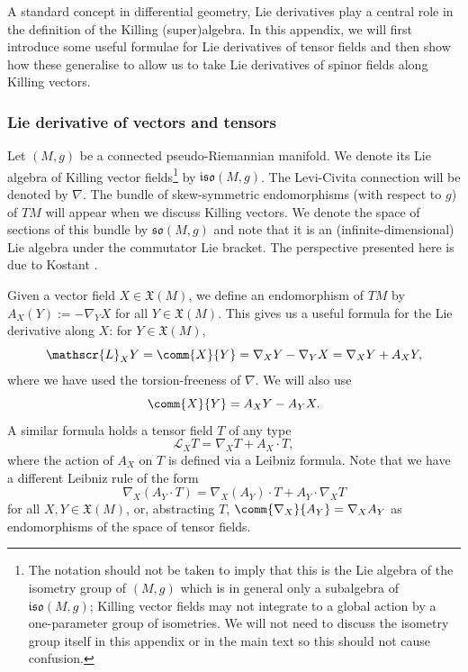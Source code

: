 \documentclass[pdftex]{sigma}
\numberwithin{equation}{section}
\newcommand{\fso}{\mathfrak{so}}
\newcommand{\fiso}{\mathfrak{iso}}
\newcommand{\fX}{\mathfrak{X}}
\newcommand{\eL}{\mathscr{L}}
\newcommand{\1}{\mathbbm{1}}
\begin{document}
A standard concept in differential geometry, Lie derivatives play a central role in the definition of the Killing (super)algebra. In this appendix, we will first introduce some useful formulae for Lie derivatives of tensor fields and then show how these generalise to allow us to take Lie derivatives of spinor fields along Killing vectors.

\subsubsection{Lie derivative of vectors and tensors}
\label{sec:lei-der-vector-tensor}

Let $(M,g)$ be a connected pseudo-Riemannian manifold. We denote its Lie algebra of Killing vector fields\footnote{The notation should not be taken to imply that this is the Lie algebra of the isometry group of $(M,g)$ which is in general only a subalgebra of $\fiso(M,g)$; Killing vector fields may not integrate to a global action by a one-parameter group of isometries. We will not need to discuss the isometry group itself in this appendix or in the main text so this should not cause confusion.}
by $\fiso(M,g)$. The Levi-Civita connection will be denoted by $\nabla$. The bundle of skew-symmetric endomorphisms (with respect to $g$) of $TM$ will appear when we discuss Killing vectors. We denote the space of sections of this bundle by $\fso(M,g)$ and note that it is an (infinite-dimensional) Lie algebra under the commutator Lie bracket. The perspective presented here is due to Kostant \cite{Kostant1955}.

Given a vector field $X\in\fX(M)$, we define an endomorphism of $TM$ by
$A_X(Y) := -\nabla_Y X
$
for all $Y\in\fX(M)$. This gives us a useful formula for the Lie derivative along $X$: for $Y\in\fX(M)$,
\begin{equation}\label{eq:lie-der-vec-formula}
	\eL_X Y = \comm{X}{Y} = \nabla_X Y - \nabla_Y X = \nabla_X Y + A_X Y,
\end{equation}
where we have used the torsion-freeness of $\nabla$. We will also use
\begin{equation}\label{eq:comm-formula}
	\comm{X}{Y} = A_X Y - A_Y X.
\end{equation}
A similar formula holds a tensor field $T$ of any type
\begin{equation}\label{eq:lie-der-tensor-formula}
	\eL_X T = \nabla_X T + A_X \cdot T,
\end{equation}
where the action of $A_X$ on $T$ is defined via a Leibniz formula. Note that we have a different Leibniz rule of the form
\[
	\nabla_X (A_Y\cdot T) = \nabla_X(A_Y)\cdot T + A_Y\cdot\nabla_X T
\]
for all $X,Y\in\fX(M)$, or, abstracting $T$, $\comm{\nabla_X}{A_Y}=\nabla_X A_Y$ as endomorphisms of the space of tensor fields.
\end{document}
